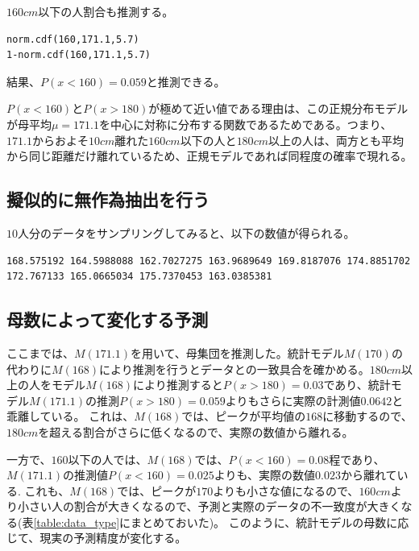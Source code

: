 $160cm$以下の人割合も推測する。
\begin{lstlisting}
norm.cdf(160,171.1,5.7)
1-norm.cdf(160,171.1,5.7)
\end{lstlisting}
結果、$P(x<160)=0.059$と推測できる。

$P(x<160)$と$P(x>180)$が極めて近い値である理由は、この正規分布モデルが母平均$\mu=171.1$を中心に対称に分布する関数であるためである。つまり、$171.1$からおよそ$10cm$離れた$160cm$以下の人と$180cm$以上の人は、両方とも平均から同じ距離だけ離れているため、正規モデルであれば同程度の確率で現れる。

\subsection{擬似的に無作為抽出を行う}
$10$人分のデータをサンプリングしてみると、以下の数値が得られる。

\begin{lstlisting}
168.575192 164.5988088 162.7027275 163.9689649 169.8187076 174.8851702 172.767133 165.0665034 175.7370453 163.0385381
\end{lstlisting}

\subsection{母数によって変化する予測}
ここまでは、$M(171.1)$を用いて、母集団を推測した。統計モデル$M(170)$の代わりに$M(168)$により推測を行うとデータとの一致具合を確かめる。$180cm$以上の人をモデル$M(168)$により推測すると$P(x>180)=0.03$であり、統計モデル$M(171.1)$の推測$P(x>180)=0.059$よりもさらに実際の計測値$0.0642$と乖離している。
これは、$M(168)$では、ピークが平均値の$168$に移動するので、$180cm$を超える割合がさらに低くなるので、実際の数値から離れる。

一方で、$160$以下の人では、$M(168)$では、$P(x<160)=0.08$程であり、$M(171.1)$の推測値$P(x<160)=0.025$よりも、実際の数値$0.023$から離れている.
これも、$M(168)$では、ピークが$170$よりも小さな値になるので、$160cm$より小さい人の割合が大きくなるので、予測と実際のデータの不一致度が大きくなる(表\ref{table:data_type}にまとめておいた)。
このように、統計モデルの母数に応じて、現実の予測精度が変化する。




